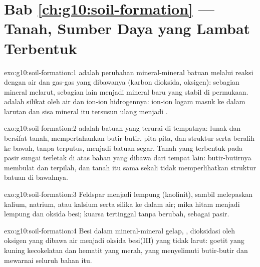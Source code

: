 \section*{Bab \ref{ch:g10:soil-formation} --- Tanah, Sumber Daya yang Lambat Terbentuk}

\begin{solution}{exo:g10:soil-formation:1}
 adalah perubahan mineral-mineral batuan melalui reaksi dengan
air dan gas-gas yang dibawanya (karbon dioksida, oksigen): sebagian mineral
melarut, sebagian lain menjadi mineral baru yang stabil di permukaan.
 adalah  silikat oleh air dan ion-ion hidrogennya:
ion-ion logam masuk ke dalam larutan dan sisa mineral itu tersusun ulang
menjadi .
\end{solution}

\begin{solution}{exo:g10:soil-formation:2}
 adalah batuan yang terurai di tempatnya: lunak dan bersifat tanah,
 mempertahankan butir-butir, pita-pita, dan struktur 
serta beralih ke bawah, tanpa terputus, menjadi batuan segar. Tanah yang
terbentuk pada pasir sungai terletak di atas bahan yang dibawa dari tempat
lain: butir-butirnya membulat dan terpilah, dan tanah itu sama sekali tidak
memperlihatkan struktur batuan di bawahnya.
\end{solution}

\begin{solution}{exo:g10:soil-formation:3}
Feldspar menjadi lempung (kaolinit), sambil melepaskan kalium, natrium, atau
kalsium serta silika ke dalam air; mika hitam menjadi lempung dan oksida besi;
kuarsa tertinggal tanpa berubah, sebagai pasir.
\end{solution}

\begin{solution}{exo:g10:soil-formation:4}
Besi dalam mineral-mineral gelap, , dioksidasi oleh oksigen yang
dibawa air menjadi oksida besi(III) yang tidak larut: goetit yang kuning
kecokelatan dan hematit yang merah, yang menyelimuti butir-butir dan mewarnai
seluruh bahan itu.
\end{solution}

